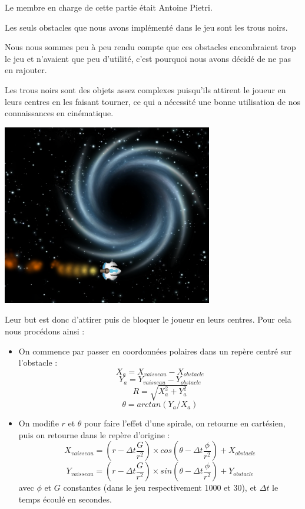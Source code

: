 \par Le membre en charge de cette partie était Antoine Pietri.

\par Les seuls obstacles que nous avons implémenté dans le jeu sont les trous noirs.
\par Nous nous sommes peu à peu rendu compte que ces obstacles encombraient trop le jeu et n'avaient
que peu d'utilité, c'est pourquoi nous avons décidé de ne pas en rajouter.
\par Les trous noirs sont des objets assez complexes puisqu'ils attirent le joueur en leurs centres en les faisant
tourner, ce qui a nécessité une bonne utilisation de nos connaissances en cinématique.

\begin{center}
	\includegraphics[width=260pt]{images/blackhole.png}
\end{center}

\par Leur but est donc d'attirer puis de bloquer le joueur en leurs centres. Pour cela nous procédons ainsi :
\begin{itemize}
	\item On commence par passer en coordonnées polaires dans un repère centré sur l'obstacle :
	$$ X_a = X_{vaisseau} - X_{obstacle} $$
	$$ Y_a = Y_{vaisseau} - Y_{obstacle} $$
	$$ R = \sqrt{X_a^2 + Y_a^2} $$
	$$ \theta = arctan(Y_a / X_a) $$
	
	\item On modifie $r$ et $\theta$ pour faire l'effet d'une spirale, on retourne en cartésien, puis on retourne dans le repère d'origine :
	$$X_{vaisseau} = (r - \Delta t \frac{G}{r^2}) \times cos(\theta - \Delta t \frac{\phi}{r^2}) + X_{obstacle}$$
	$$Y_{vaisseau} = (r - \Delta t \frac{G}{r^2}) \times sin(\theta - \Delta t \frac{\phi}{r^2}) + Y_{obstacle}$$
	avec $\phi$ et $G$ constantes (dans le jeu respectivement 1000 et 30), et $\Delta t$ le temps écoulé en secondes.
\end{itemize}
